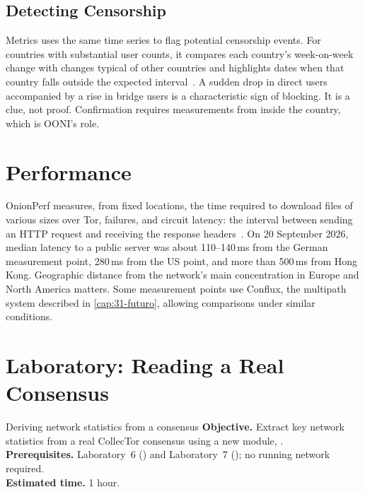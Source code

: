 \subsection{Detecting Censorship}

Metrics uses the same time series to flag potential censorship events. For countries with substantial user counts, it compares each country's week-on-week change with changes typical of other countries and highlights dates when that country falls outside the expected interval~\cite{metricsreproducible}. A sudden drop in direct users accompanied by a rise in bridge users is a characteristic sign of blocking. It is a clue, not proof. Confirmation requires measurements from inside the country, which is OONI's role.

\section{Performance}\label{sec:metrics-prestazioni}

OnionPerf measures, from fixed locations, the time required to download files of various sizes over Tor, failures, and circuit latency: the interval between sending an HTTP request and receiving the response headers~\cite{metricsreproducible}. On 20 September 2026, median latency to a public server was about 110--140\,ms from the German measurement point, 280\,ms from the US point, and more than 500\,ms from Hong Kong. Geographic distance from the network's main concentration in Europe and North America matters. Some measurement points use Conflux, the multipath system described in \cref{cap:31-futuro}, allowing comparisons under similar conditions.

\section{Laboratory: Reading a Real Consensus}\label{sec:lab-metrics}

\begin{laboratorio}[15]{Deriving network statistics from a consensus}
\textbf{Objective.} Extract key network statistics from a real CollecTor consensus using a new module, .\\
\textbf{Prerequisites.} Laboratory~6 () and Laboratory~7 (); no running network required.\\
\textbf{Estimated time.} 1 hour.
\end{laboratorio}


